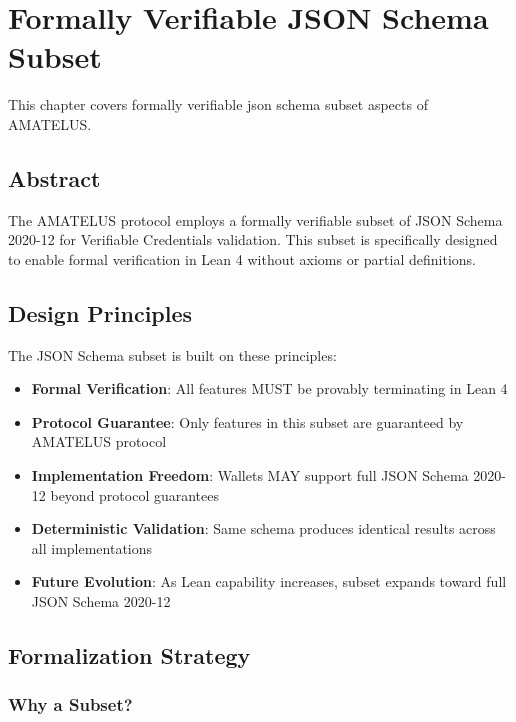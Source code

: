 \chapter{Formally Verifiable JSON Schema Subset}


\begin{definition}
  \label{def:schema-chapter}
  This chapter covers formally verifiable json schema subset aspects of AMATELUS.
  \leanok
\end{definition}
\section{Abstract}

The AMATELUS protocol employs a formally verifiable subset of JSON Schema 2020-12 for Verifiable Credentials validation. This subset is specifically designed to enable formal verification in Lean 4 without axioms or partial definitions.

\section{Design Principles}

The JSON Schema subset is built on these principles:

\begin{itemize}
  \item \textbf{Formal Verification}: All features MUST be provably terminating in Lean 4
  \item \textbf{Protocol Guarantee}: Only features in this subset are guaranteed by AMATELUS protocol
  \item \textbf{Implementation Freedom}: Wallets MAY support full JSON Schema 2020-12 beyond protocol guarantees
  \item \textbf{Deterministic Validation}: Same schema produces identical results across all implementations
  \item \textbf{Future Evolution}: As Lean capability increases, subset expands toward full JSON Schema 2020-12
\end{itemize}

\section{Formalization Strategy}

\subsection{Why a Subset?}

